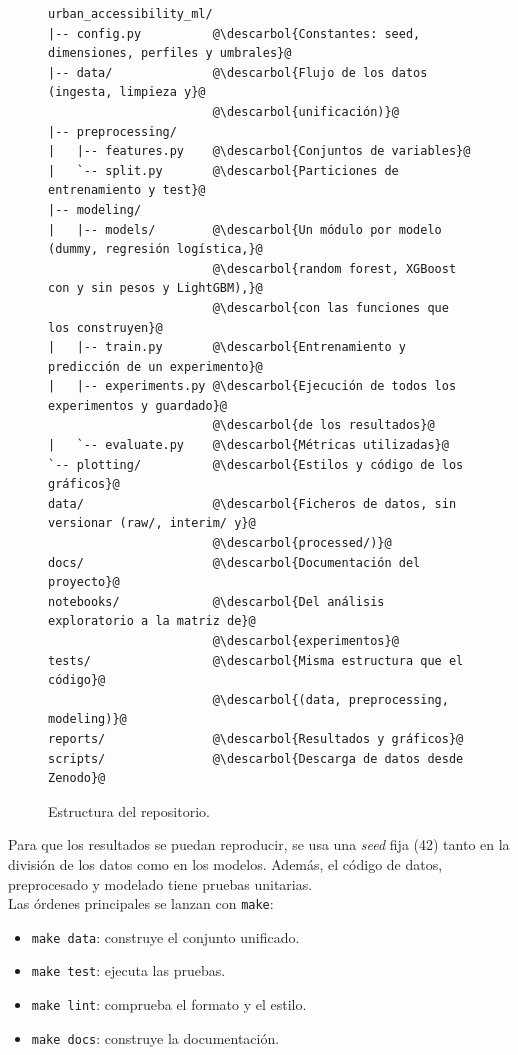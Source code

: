 \begin{figure}[htbp]
\begin{lstlisting}[style=tfmarbol]
urban_accessibility_ml/
|-- config.py          @\descarbol{Constantes: seed, dimensiones, perfiles y umbrales}@
|-- data/              @\descarbol{Flujo de los datos (ingesta, limpieza y}@
                       @\descarbol{unificación)}@
|-- preprocessing/
|   |-- features.py    @\descarbol{Conjuntos de variables}@
|   `-- split.py       @\descarbol{Particiones de entrenamiento y test}@
|-- modeling/
|   |-- models/        @\descarbol{Un módulo por modelo (dummy, regresión logística,}@
                       @\descarbol{random forest, XGBoost con y sin pesos y LightGBM),}@
                       @\descarbol{con las funciones que los construyen}@
|   |-- train.py       @\descarbol{Entrenamiento y predicción de un experimento}@
|   |-- experiments.py @\descarbol{Ejecución de todos los experimentos y guardado}@
                       @\descarbol{de los resultados}@
|   `-- evaluate.py    @\descarbol{Métricas utilizadas}@
`-- plotting/          @\descarbol{Estilos y código de los gráficos}@
data/                  @\descarbol{Ficheros de datos, sin versionar (raw/, interim/ y}@
                       @\descarbol{processed/)}@
docs/                  @\descarbol{Documentación del proyecto}@
notebooks/             @\descarbol{Del análisis exploratorio a la matriz de}@
                       @\descarbol{experimentos}@
tests/                 @\descarbol{Misma estructura que el código}@
                       @\descarbol{(data, preprocessing, modeling)}@
reports/               @\descarbol{Resultados y gráficos}@
scripts/               @\descarbol{Descarga de datos desde Zenodo}@
\end{lstlisting}
\caption{Estructura del repositorio.}\label{fig:estructura-repositorio}
\end{figure}

Para que los resultados se puedan reproducir, se usa una \textit{seed} fija (42) tanto en la división de los datos como en los modelos. Además, el código de datos, preprocesado y modelado tiene pruebas unitarias.
\\

Las órdenes principales se lanzan con \texttt{make}:

\begin{itemize}
  \item \texttt{make data}: construye el conjunto unificado.
  \item \texttt{make test}: ejecuta las pruebas.
  \item \texttt{make lint}: comprueba el formato y el estilo.
  \item \texttt{make docs}: construye la documentación.
\end{itemize}

